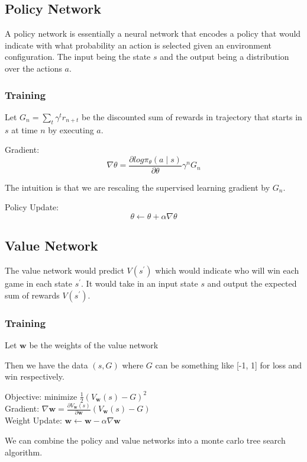\documentclass[12pt]{article}
\begin{document}
    \subsection{Policy Network}
        A policy network is essentially a neural network that encodes a policy that would indicate with what probability
        an action is selected given an environment configuration. The input being the state $s$ and the output being a
        distribution over the actions $a$. 

        \subsubsection{Training}
            Let $G_n = \sum_t \gamma^t r_{n+t}$ be the discounted sum of rewards in trajectory that starts in $s$ at
            time $n$ by executing $a$. 

            Gradient: 
            $$\nabla \theta = \frac{\partial{log \pi_{\theta}(a \mid s)}}{\partial \theta} \gamma^n G_n$$

            The intuition is that we are rescaling the supervised learning gradient by $G_n$.

            Policy Update:
            $$ \theta \gets \theta + \alpha \nabla \theta $$

    \subsection{Value Network}
        The value network would predict $V(s^{\prime})$ which would indicate who will win each game in each state
        $s^{\prime}$. It would take in an input state $s$ and output the expected sum of rewards $V(s^{\prime})$.
        
        \subsubsection{Training}
            Let $\boldsymbol{w}$ be the weights of the value network

            Then we have the data $(s, G)$ where $G$ can be something like [-1, 1] for loss and win respectively.

            Objective: minimize $\frac{1}{2} (V_{\boldsymbol{w}}(s) - G)^2$ \\
            Gradient: $\nabla \boldsymbol{w} = \frac{\partial V_{\boldsymbol{w}}(s)}{\partial \boldsymbol{w}}
            (V_{\boldsymbol{w}}(s) - G)$ \\
            Weight Update: $\boldsymbol{w} \gets \boldsymbol{w} - \alpha \nabla \boldsymbol{w}$

    We can combine the policy and value networks into a monte carlo tree search algorithm. 

\printindex
\end{document}
